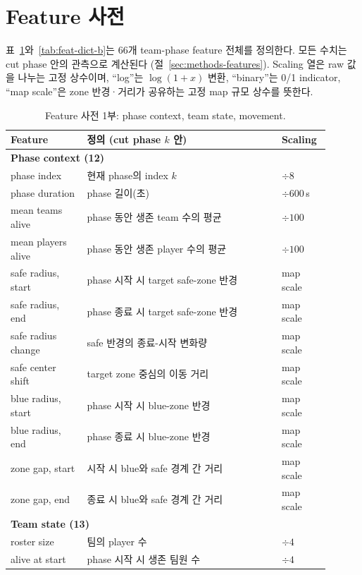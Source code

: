 \section{Feature 사전}
\label{app:features}

표~\ref{tab:feat-dict-a}와~\ref{tab:feat-dict-b}는 66개 team-phase feature
전체를 정의한다. 모든 수치는 cut phase 안의 관측으로 계산된다
(절~\ref{sec:methods-features}). Scaling 열은 raw 값을 나누는 고정 상수이며,
``log''는 \(\log(1{+}x)\) 변환, ``binary''는 0/1 indicator, ``map scale''은
zone 반경·거리가 공유하는 고정 map 규모 상수를 뜻한다.

\begin{table}[t]
\centering
\caption{Feature 사전 1부: phase context, team state, movement.}
\label{tab:feat-dict-a}
\footnotesize
\begin{tabular}{p{0.22\linewidth}p{0.56\linewidth}p{0.12\linewidth}}
\toprule
Feature & 정의 (cut phase \(k\) 안) & Scaling \\
\midrule
\multicolumn{3}{l}{\textbf{Phase context (12)}} \\
phase index & 현재 phase의 index \(k\) & \(\div 8\) \\
phase duration & phase 길이(초) & \(\div 600\)\,s \\
mean teams alive & phase 동안 생존 team 수의 평균 & \(\div 100\) \\
mean players alive & phase 동안 생존 player 수의 평균 & \(\div 100\) \\
safe radius, start & phase 시작 시 target safe-zone 반경 & map scale \\
safe radius, end & phase 종료 시 target safe-zone 반경 & map scale \\
safe radius change & safe 반경의 종료-시작 변화량 & map scale \\
safe center shift & target zone 중심의 이동 거리 & map scale \\
blue radius, start & phase 시작 시 blue-zone 반경 & map scale \\
blue radius, end & phase 종료 시 blue-zone 반경 & map scale \\
zone gap, start & 시작 시 blue와 safe 경계 간 거리 & map scale \\
zone gap, end & 종료 시 blue와 safe 경계 간 거리 & map scale \\
\midrule
\multicolumn{3}{l}{\textbf{Team state (13)}} \\
roster size & 팀의 player 수 & \(\div 4\) \\
alive at start & phase 시작 시 생존 팀원 수 & \(\div 4\) \\

\end{tabular}
\end{table}
